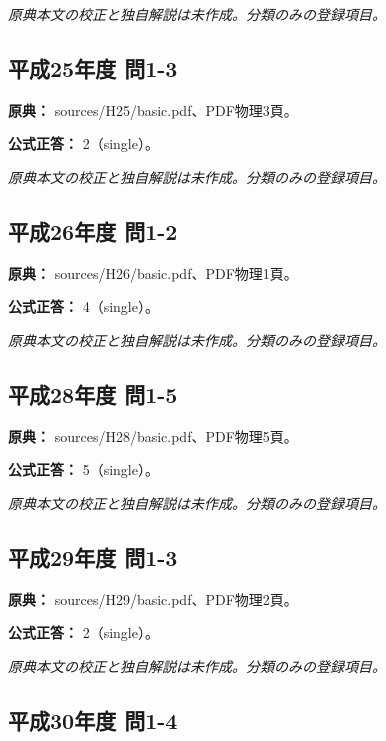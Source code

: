 \par\textit{原典本文の校正と独自解説は未作成。分類のみの登録項目。}

\subsection{平成25年度 問1-3}
\label{q:h25-reg-basic-1-3}

\noindent\textbf{原典：} sources/H25/basic.pdf、PDF物理3頁。

\textbf{公式正答：} 2（single）。

\par\textit{原典本文の校正と独自解説は未作成。分類のみの登録項目。}

\subsection{平成26年度 問1-2}
\label{q:h26-reg-basic-1-2}

\noindent\textbf{原典：} sources/H26/basic.pdf、PDF物理1頁。

\textbf{公式正答：} 4（single）。

\par\textit{原典本文の校正と独自解説は未作成。分類のみの登録項目。}

\subsection{平成28年度 問1-5}
\label{q:h28-reg-basic-1-5}

\noindent\textbf{原典：} sources/H28/basic.pdf、PDF物理5頁。

\textbf{公式正答：} 5（single）。

\par\textit{原典本文の校正と独自解説は未作成。分類のみの登録項目。}

\subsection{平成29年度 問1-3}
\label{q:h29-reg-basic-1-3}

\noindent\textbf{原典：} sources/H29/basic.pdf、PDF物理2頁。

\textbf{公式正答：} 2（single）。

\par\textit{原典本文の校正と独自解説は未作成。分類のみの登録項目。}

\subsection{平成30年度 問1-4}
\label{q:h30-reg-basic-1-4}

